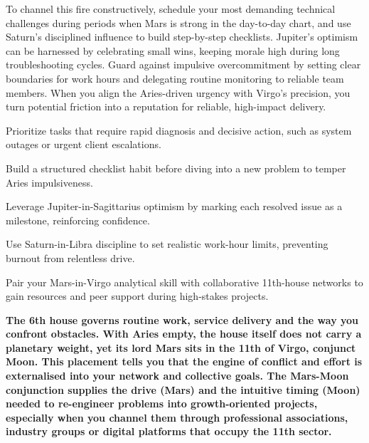 {\fontsize{9}{13}\selectfont To channel this fire constructively, schedule your most demanding technical challenges during periods when Mars is strong in the day-to-day chart, and use Saturn's disciplined influence to build step-by-step checklists. Jupiter's optimism can be harnessed by celebrating small wins, keeping morale high during long troubleshooting cycles. Guard against impulsive overcommitment by setting clear boundaries for work hours and delegating routine monitoring to reliable team members. When you align the Aries-driven urgency with Virgo's precision, you turn potential friction into a reputation for reliable, high-impact delivery.}\par\vspace{1.8mm}

\begin{diamondlist}
  \item {\fontsize{8.5}{12}\selectfont Prioritize tasks that require rapid diagnosis and decisive action, such as system outages or urgent client escalations.}
  \item {\fontsize{8.5}{12}\selectfont Build a structured checklist habit before diving into a new problem to temper Aries impulsiveness.}
  \item {\fontsize{8.5}{12}\selectfont Leverage Jupiter-in-Sagittarius optimism by marking each resolved issue as a milestone, reinforcing confidence.}
  \item {\fontsize{8.5}{12}\selectfont Use Saturn-in-Libra discipline to set realistic work-hour limits, preventing burnout from relentless drive.}
  \item {\fontsize{8.5}{12}\selectfont Pair your Mars-in-Virgo analytical skill with collaborative 11th-house networks to gain resources and peer support during high-stakes projects.}
\end{diamondlist}


\label{topic15}

{\fontsize{9.5}{13.8}\selectfont\bfseries\color{DeepSlate} The 6th house governs routine work, service delivery and the way you confront obstacles. With Aries empty, the house itself does not carry a planetary weight, yet its lord Mars sits in the 11th of Virgo, conjunct Moon. This placement tells you that the engine of conflict and effort is externalised into your network and collective goals. The Mars-Moon conjunction supplies the drive (Mars) and the intuitive timing (Moon) needed to re-engineer problems into growth-oriented projects, especially when you channel them through professional associations, industry groups or digital platforms that occupy the 11th sector.}\par\vspace{2mm}

